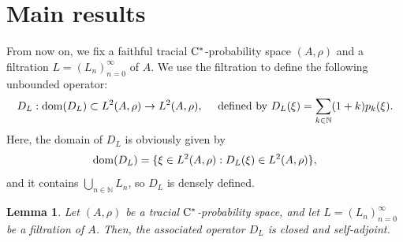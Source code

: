 \documentclass[11pt]{article}
\newtheorem{lem}[thm]{Lemma}
\theoremstyle{definition}
\theoremstyle{remark}
\numberwithin{equation}{section}
\numberwithin{equation}{section}
\def\N{\mathbb{N}}
\numberwithin{equation}{section}
\begin{document}
\section{Main results}


From now on, we fix a faithful tracial ${\rm C}^*$-probability space $(A,\rho)$ and a filtration $L=(L_{n})_{n=0}^{\infty}$ of $A$. We use the filtration to define the following unbounded operator:
$$
D_L:{\rm dom}(D_L)\subset L^{2}(A,\rho)\to L^{2}(A,\rho),\quad \text{ defined by }D_L(\xi)=\sum_{k\in\N}(1+k)p_k(\xi).
$$
Here, the domain of $D_L$ is obviously given by
$$
{\rm dom}(D_L)=\{\xi\in  L^{2}(A,\rho): D_L(\xi)\in L^{2}(A,\rho)\},
$$
and it contains $\bigcup_{n\in\N} L_n$, so $D_L$ is densely defined.
\begin{lem}\label{closedd}
    Let $(A,\rho)$ be a tracial ${\rm C}^*$-probability space, and let $L=(L_{n})_{n=0}^{\infty}$ be a filtration of $A$. Then, the associated operator $D_L$ is closed and self-adjoint.
\end{lem}
\end{document}
